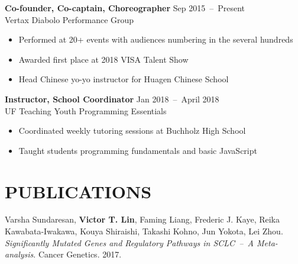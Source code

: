 \documentclass[line,resmargin]{res}
\begin{document}
\begin{resume}

    \textbf{Co-founder, Co-captain, Choreographer}    \hfill Sep 2015~--~Present \\
    Vertax Diabolo Performance Group
    \begin{itemize}  \itemsep -2pt %
        \item Performed at 20+ events with audiences numbering in the several hundreds
        \item Awarded first place at 2018 VISA Talent Show
        \item Head Chinese yo-yo instructor for Huagen Chinese School
    \end{itemize}

    \textbf{Instructor, School Coordinator}    \hfill Jan 2018~--~April 2018 \\
    UF Teaching Youth Programming Essentials
    \begin{itemize}  \itemsep -2pt %
        \item Coordinated weekly tutoring sessions at Buchholz High School
        \item Taught students programming fundamentals and basic JavaScript
    \end{itemize}

\section{PUBLICATIONS}
    Varsha Sundaresan, \textbf{Victor T. Lin}, Faming Liang, Frederic J. Kaye, Reika Kawabata-Iwakawa, Kouya Shiraishi, Takashi Kohno, Jun Yokota, Lei Zhou.
    \textit{Significantly Mutated Genes and Regulatory Pathways in SCLC~--~A Meta-analysis}. Cancer Genetics. 2017.

\end{resume}
\end{document}
